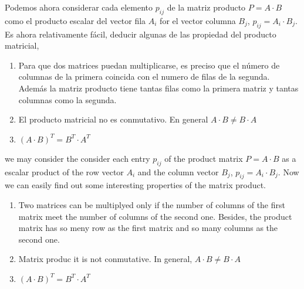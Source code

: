 \begin{paracol}{2}
Podemos ahora considerar  cada elemento $p_{ij}$ de la matriz producto $P=A\cdot B$ como el producto escalar del vector fila $A_i$ for el vector columna $B_j$, $p_{ij}=A_i\cdot B_j$. 
Es ahora relativamente fácil, deducir algunas de las propiedad del producto matricial,

\begin{enumerate}
\item Para que dos matrices puedan multiplicarse, es preciso que el número de columnas de la primera coincida con el numero de filas de la segunda. Además la matriz producto tiene tantas filas como la primera matriz y tantas columnas como la segunda.

\item El producto matricial no es conmutativo. En general $A\cdot B \neq B \cdot A$

\item $(A\cdot B)^T=B^T\cdot A^T$
\end{enumerate}

\switchcolumn
we may consider the consider each entry $p_{ij}$ of the product matrix $P=A\cdot B$ as a escalar product of the row vector $A_i$ and the column vector $B_j$, $p_{ij} = A_i\cdot B_j$. Now we can easily find out some interesting properties of the matrix product.

\begin{enumerate}
\item Two matrices can be multiplyed only if the number of columns of the first matrix meet the number of columns of the second one. Besides, the product matrix has so meny row as the first matrix and so many columns as the second one.

\item Matrix produc it is not conmutative. In general, $A\cdot B \neq B \cdot A$

\item $(A\cdot B)^T=B^T\cdot A^T$
\end{enumerate}

\end{paracol}

